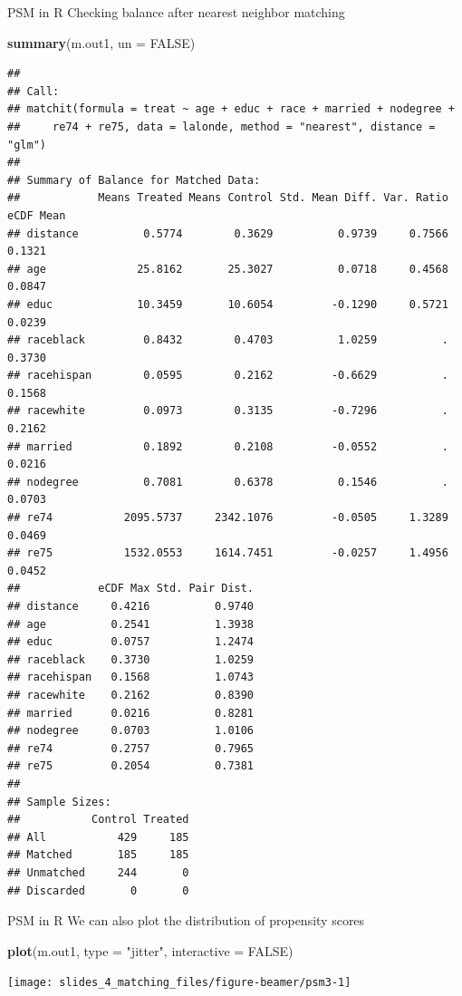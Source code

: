 \documentclass[
  ignorenonframetext,
  aspectratio=169, handout]{beamer}
\newenvironment{Shaded}{\begin{snugshade}}{\end{snugshade}}
\newcommand{\AttributeTok}[1]{\textcolor[rgb]{0.13,0.29,0.53}{#1}}
\newcommand{\ConstantTok}[1]{\textcolor[rgb]{0.56,0.35,0.01}{#1}}
\newcommand{\FunctionTok}[1]{\textcolor[rgb]{0.13,0.29,0.53}{\textbf{#1}}}
\newcommand{\NormalTok}[1]{#1}
\newcommand{\StringTok}[1]{\textcolor[rgb]{0.31,0.60,0.02}{#1}}
\begin{document}
\begin{frame}[fragile]{PSM in R}
\protect\hypertarget{psm-in-r-1}{}
Checking balance after nearest neighbor matching

\scriptsize

\begin{Shaded}
\begin{Highlighting}[]
\FunctionTok{summary}\NormalTok{(m.out1, }\AttributeTok{un =} \ConstantTok{FALSE}\NormalTok{)}
\end{Highlighting}
\end{Shaded}

\begin{verbatim}
## 
## Call:
## matchit(formula = treat ~ age + educ + race + married + nodegree + 
##     re74 + re75, data = lalonde, method = "nearest", distance = "glm")
## 
## Summary of Balance for Matched Data:
##            Means Treated Means Control Std. Mean Diff. Var. Ratio eCDF Mean
## distance          0.5774        0.3629          0.9739     0.7566    0.1321
## age              25.8162       25.3027          0.0718     0.4568    0.0847
## educ             10.3459       10.6054         -0.1290     0.5721    0.0239
## raceblack         0.8432        0.4703          1.0259          .    0.3730
## racehispan        0.0595        0.2162         -0.6629          .    0.1568
## racewhite         0.0973        0.3135         -0.7296          .    0.2162
## married           0.1892        0.2108         -0.0552          .    0.0216
## nodegree          0.7081        0.6378          0.1546          .    0.0703
## re74           2095.5737     2342.1076         -0.0505     1.3289    0.0469
## re75           1532.0553     1614.7451         -0.0257     1.4956    0.0452
##            eCDF Max Std. Pair Dist.
## distance     0.4216          0.9740
## age          0.2541          1.3938
## educ         0.0757          1.2474
## raceblack    0.3730          1.0259
## racehispan   0.1568          1.0743
## racewhite    0.2162          0.8390
## married      0.0216          0.8281
## nodegree     0.0703          1.0106
## re74         0.2757          0.7965
## re75         0.2054          0.7381
## 
## Sample Sizes:
##           Control Treated
## All           429     185
## Matched       185     185
## Unmatched     244       0
## Discarded       0       0
\end{verbatim}
\end{frame}

\begin{frame}[fragile]{PSM in R}
\protect\hypertarget{psm-in-r-2}{}
We can also plot the distribution of propensity scores

\begin{Shaded}
\begin{Highlighting}[]
\FunctionTok{plot}\NormalTok{(m.out1, }\AttributeTok{type =} \StringTok{"jitter"}\NormalTok{, }\AttributeTok{interactive =} \ConstantTok{FALSE}\NormalTok{)}
\end{Highlighting}
\end{Shaded}

\texttt{[image: slides\_4\_matching\_files/figure-beamer/psm3-1]}
\end{frame}
\end{document}
